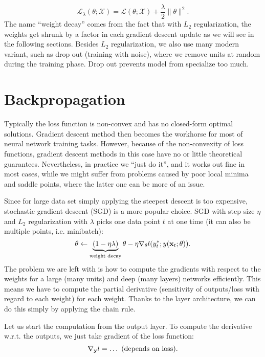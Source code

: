 \documentclass[../book-template.tex]{subfiles}
\begin{document}
\begin{equation*}
	\mathcal{L}_{\lambda}(\theta;\mathcal{X}) = \mathcal{L}(\theta;\mathcal{X}) + \frac{\lambda}{2}\|\theta\|^2.
\end{equation*} 
The name ``weight decay'' comes from the fact that with $L_2$ regularization, the weights get shrunk by a factor in each gradient descent update as we will see in the following sections. Besides $L_2$ regularization, we also use many modern variant, such as drop out (training with noise), where we remove units at random during the training phase. Drop out prevents model from specialize too much.
\section{Backpropagation}
Typically the loss function is non-convex and has no closed-form optimal solutions. Gradient descent method then becomes the workhorse for most of neural network training tasks. However, because of the non-convexity of loss functions, gradient descent methods in this case have no or little theoretical guarantees. Nevertheless, in practice we ``just do it'', and it works out fine in most cases, while we might suffer from problems caused by poor local minima and saddle points, where the latter one can be more of an issue.
\par Since for large data set simply applying the steepest descent is too expensive, stochastic gradient descent (SGD) is a more popular choice. SGD with step size $\eta$ and $L_2$ regularization with $\lambda$ picks one data point $t$ at one time (it can also be multiple points, i.e. minibatch):
\begin{equation*}
	\theta\leftarrow \underbrace{(1-\eta\lambda)}_{\text{weight decay}}\theta - \eta\nabla_{\theta}l(y_t^*;y({\bf x}_t;\theta)).
\end{equation*}
The problem we are left with is how to compute the gradients with respect to the weights for a large (many units) and deep (many layers) networks efficiently. This means we have to compute the partial derivative (sensitivity of outputs/loss with regard to each weight) for each weight. Thanks to the layer architecture, we can do this simply by applying the chain rule.
\par Let us start the computation from the output layer. To compute the derivative w.r.t. the outputs, we just take gradient of the loss function:
\begin{equation*}
	\nabla_{\bf y}l = \dots\ \text{(depends on loss)}.
\end{equation*}
\end{document}
